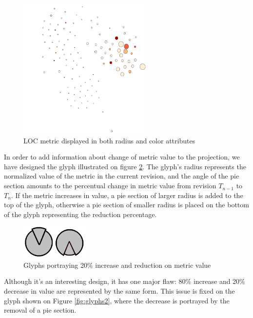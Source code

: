 \begin{figure}[H]
  \centering
  \includegraphics[width=0.6\textwidth]{figures/max_inh_tree.png}
  \caption{LOC metric displayed in both radius and color attributes}
  \label{fig:max_inh_tree}
\end{figure}

In order to add information about change of metric value to the projection, we have designed the glyph illustrated on figure \ref{fig:glyphs1}. The glyph's radius represents the normalized value of the metric in the current revision, and the angle of the pie section amounts to the percentual change in metric value from revision $T_{n-1}$ to $T_{n}$. If the metric increases in value, a pie section of larger radius is added to the top of the glyph, otherwise a pie section of smaller radius is placed on the bottom of the glyph representing the reduction percentage.

\begin{figure}[H]
  \centering
  \includegraphics[width=0.3\textwidth]{figures/glyphs_1.png}
  \caption{Glyphs portraying 20\% increase and reduction on metric value}
  \label{fig:glyphs1}
\end{figure}

Although it's an interesting design, it has one major flaw: 80\% increase and 20\% decrease in value are represented by the same form. This issue is fixed on the glyph shown on Figure \ref{fig:glyphs2}, where the decrease is portrayed by the removal of a pie section.

